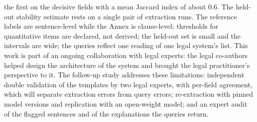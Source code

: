 the first on the decisive fields with a mean Jaccard index of about 0.6. The held-out stability estimate rests on a single pair of extraction runs. The reference labels are sentence-level while the Annex is clause-level; thresholds for quantitative items are declared, not derived; the held-out set is small and the intervals are wide; the queries reflect one reading of one legal system's list. This work is part of an ongoing collaboration with legal experts: the legal co-authors helped design the architecture of the system and brought the legal practitioner's perspective to it. The follow-up study addresses these limitations: independent double validation of the templates by two legal experts, with per-field agreement, which will separate extraction errors from query errors; re-extraction with pinned model versions and replication with an open-weight model; and an expert audit of the flagged sentences and of the explanations the queries return.

